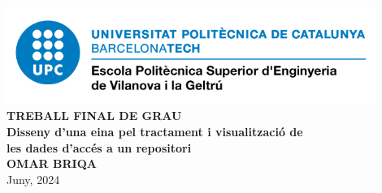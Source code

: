 \begin{titlepage}
    \begin{center}

        \vspace*{-3cm}
        \includegraphics[width=0.9\textwidth]{figures/epsevg-logo} \\ [1cm]

        \Huge
        \textbf{TREBALL FINAL DE GRAU} \\ [2cm]

        \Huge
        \textbf{Disseny d'una eina pel tractament i visualització de \\ les dades d'accés a un repositori} \\ [2cm]

        \huge
        \textbf{OMAR BRIQA} \\ [2cm]
        Juny, 2024

    \end{center}
\end{titlepage}
